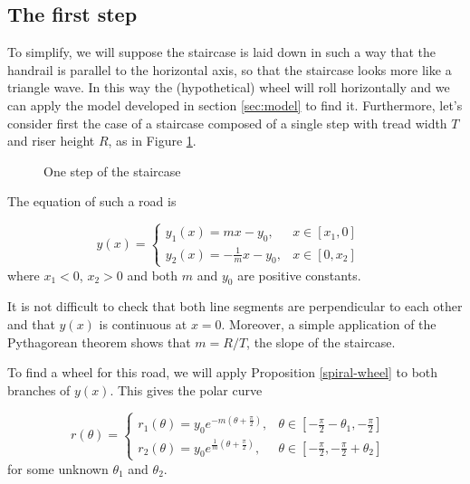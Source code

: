 \documentclass{article}
\theoremstyle{theorem}
\theoremstyle{theorem}
\begin{document}
\subsection{The first step}

To simplify, we will suppose the staircase is laid down in such a way
that the handrail is parallel to the horizontal axis, so that the
staircase looks more like a triangle wave. In this way the
(hypothetical) wheel will roll horizontally and we can apply the model
developed in section \ref{sec:model} to find it. Furthermore, let's
consider first the case of a staircase composed of a single step with
tread width $T$ and riser height $R$, as in Figure \ref{fig:step}.

\begin{figure}[h]
  \centering 
  \caption{One step of the staircase}
  \label{fig:step}
\end{figure}

The equation of such a road is

\begin{equation}
  \label{eq:staircase}
  y(x)=
  \left \lbrace
    \begin{array}{ll}
      y_1(x) = mx-y_0, & x \in [x_1,0] \\
      y_2(x) = -\frac{1}{m}x-y_0, & x \in [0, x_2]
    \end{array}
  \right. \quad
\end{equation}
where $x_1<0$, $x_2>0$ and both $m$ and $y_0$ are positive constants.

It is not difficult to check that both line segments are perpendicular
to each other and that $y(x)$ is continuous at $x=0$. Moreover, a
simple application of the Pythagorean theorem shows that $m=R/T$, the
slope of the staircase.

To find a wheel for this road, we will apply Proposition
\ref{spiral-wheel} to both branches of $y(x)$. This gives the polar
curve

\begin{equation}
  \label{eq:petal}
  r(\theta)=
  \left \lbrace
    \begin{array}{ll}
      r_1(\theta) = y_0e^{-m\left(\theta+\frac{\pi}{2}\right)}, & \theta \in \left[-\frac{\pi}{2}-\theta_1,-\frac{\pi}{2}\right] \\
      r_2(\theta) = y_0e^{\frac{1}{m}\left(\theta+\frac{\pi}{2}\right)}, & \theta \in \left[-\frac{\pi}{2}, -\frac{\pi}{2}+\theta_2\right]
    \end{array}
  \right. \quad
\end{equation}
for some unknown $\theta_1$ and $\theta_2$.
\end{document}
